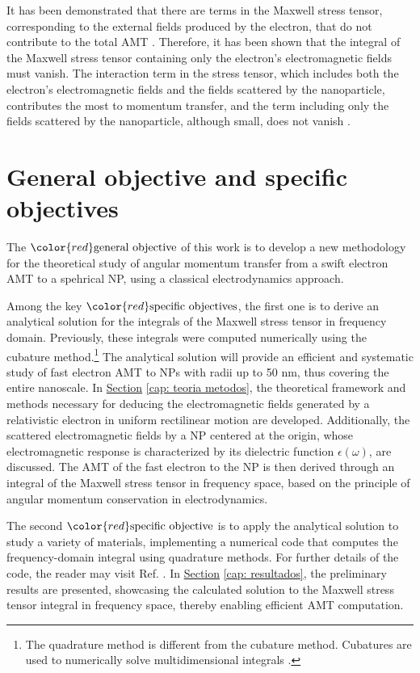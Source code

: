 It has been demonstrated that there are terms in the Maxwell stress tensor, corresponding to the external fields produced by the electron, that do not contribute to the total AMT \cite{castellanos2023theory}. Therefore, it has been shown that the integral of the Maxwell stress tensor containing only the electron's electromagnetic fields must vanish. The interaction term in the stress tensor, which includes both the electron's electromagnetic fields and the fields scattered by the nanoparticle, contributes the most to momentum transfer, and the term including only the fields scattered by the nanoparticle, although small, does not vanish \cite{castellanos2021phdthesis, castrejon2021phdthesis}.
\section{General objective and specific objectives}


The ${\color{red}\text{general objective}}$ of this work is to develop a new methodology for the theoretical study of angular momentum transfer from a swift electron AMT to a spehrical NP, using a classical electrodynamics approach. 

Among the key ${\color{red}\text{specific objectives}}$, the first one is to derive an analytical solution for the integrals of the Maxwell stress tensor in frequency domain. Previously, these integrals were computed numerically using the cubature method.\footnote{The quadrature method is different from the cubature method. Cubatures are used to numerically solve multidimensional integrals \cite{hahn2007cuba}.} The analytical solution will provide an efficient and systematic study of fast electron AMT to NPs with radii up to 50 nm, thus covering the entire nanoscale. In \hyperref[cap: teoria metodos]{Section} \ref{cap: teoria metodos}, the theoretical framework and methods necessary for deducing the electromagnetic fields generated by a relativistic electron in uniform rectilinear motion are developed. Additionally, the scattered electromagnetic fields by a NP centered at the origin, whose electromagnetic response is characterized by its dielectric function $\epsilon(\omega)$, are discussed. The AMT of the fast electron to the NP is then derived through an integral of the Maxwell stress tensor in frequency space, based on the principle of angular momentum conservation in electrodynamics.

The second ${\color{red}\text{specific objective}}$ is to apply the analytical solution to study a variety of materials, implementing a numerical code that computes the frequency-domain integral using quadrature methods. For further details of the code, the reader may visit Ref. \cite{Briseno2024AMTgithub}. In \hyperref[cap: resultados]{Section} \ref{cap: resultados}, the preliminary results are presented, showcasing the calculated solution to the Maxwell stress tensor integral in frequency space, thereby enabling efficient AMT computation.

